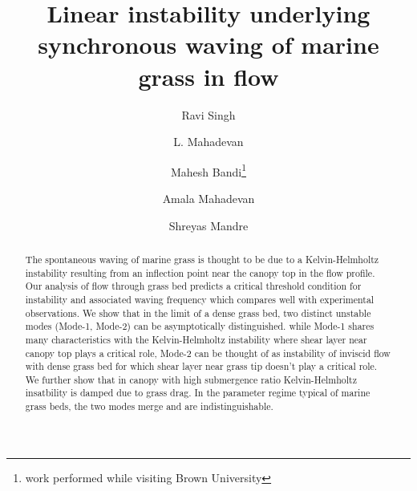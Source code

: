 \documentclass[aps,prl,reprint,twocolumn,showpacs,superscriptaddress,10pt]{revtex4-1}  %
\begin{document}
\title{Linear instability underlying synchronous waving of marine grass in flow}
\author{Ravi Singh}
\author{L. Mahadevan}
\author{Mahesh Bandi\thanks{work performed while visiting Brown University}}
\author{Amala Mahadevan}
\author{Shreyas Mandre}

\begin{abstract}


The spontaneous waving of marine grass is thought to be due to a Kelvin-Helmholtz instability resulting from an inflection point near the canopy top in the flow profile.
 Our analysis of flow through grass bed predicts a critical threshold condition for instability and associated waving frequency
which compares well with experimental observations. We show that in the limit of a dense grass bed, two distinct unstable modes (Mode-1, Mode-2) can be asymptotically distinguished.
while Mode-1 shares many characteristics with the Kelvin-Helmholtz instability where shear layer near canopy top plays a critical role, 
Mode-2 can be thought of as instability of inviscid flow with dense grass bed for which shear 
layer near grass tip doesn't play a critical role. We further show that in canopy with high submergence ratio
Kelvin-Helmholtz insatbility is damped due to grass drag. In the parameter regime typical of marine grass beds, the two modes merge and are indistinguishable.


\end{abstract}
\end{document}
